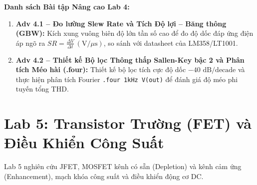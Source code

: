 \documentclass[12pt,a4paper]{report}
\begin{document}
\textbf{Danh sách Bài tập Nâng cao Lab 4:}
\begin{enumerate}
    \item \textbf{Adv 4.1 -- Đo lường Slew Rate và Tích Độ lợi -- Băng thông (GBW):} Kích xung vuông biên độ lớn tần số cao để đo độ dốc đáp ứng điện áp ngõ ra $SR = \frac{\Delta V}{\Delta t}\ (\text{V}/\mu\text{s})$, so sánh với datasheet của LM358/LT1001.
    \item \textbf{Adv 4.2 -- Thiết kế Bộ lọc Thông thấp Sallen-Key bậc 2 và Phân tích Méo hài (.four):} Thiết kế bộ lọc tích cực độ dốc $-40\text{ dB/decade}$ và thực hiện phân tích Fourier \lstinline|.four 1kHz V(out)| để đánh giá độ méo phi tuyến tổng THD.
\end{enumerate}

\section{Lab 5: Transistor Trường (FET) và Điều Khiển Công Suất}
Lab 5 nghiên cứu JFET, MOSFET kênh có sẵn (Depletion) và kênh cảm ứng (Enhancement), mạch khóa công suất và điều khiển động cơ DC.
\end{document}
